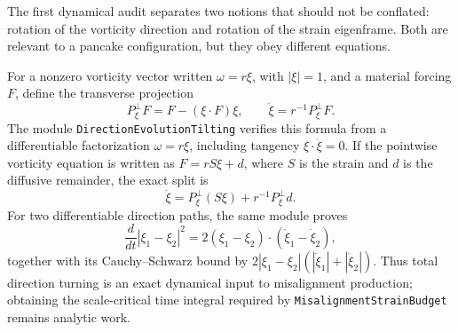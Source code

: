 \documentclass[11pt]{article}
\theoremstyle{definition}
\begin{document}
The first dynamical audit separates two notions that should not be
conflated: rotation of the vorticity direction and rotation of the strain
eigenframe.  Both are relevant to a pancake configuration, but they obey
different equations.

For a nonzero vorticity vector written $\omega=r\xi$, with $|\xi|=1$, and a
material forcing $F$, define the transverse projection
\[
  P_{\xi}^{\perp}F=F-(\xi\cdot F)\xi,
  \qquad \dot\xi=r^{-1}P_{\xi}^{\perp}F.
\]
The module \texttt{DirectionEvolutionTilting} verifies this formula from a
differentiable factorization $\omega=r\xi$, including tangency
$\xi\cdot\dot\xi=0$.  If the pointwise vorticity equation is written as
$F=rS\xi+d$, where $S$ is the strain and $d$ is the diffusive remainder,
the exact split is
\[
  \dot\xi=P_{\xi}^{\perp}(S\xi)
       +r^{-1}P_{\xi}^{\perp}d.
\]
For two differentiable direction paths, the same module proves
\[
  \frac{d}{dt}|\xi_1-\xi_2|^2
   =2(\xi_1-\xi_2)\cdot(\dot\xi_1-\dot\xi_2),
\]
together with its Cauchy--Schwarz bound by
$2|\xi_1-\xi_2|(|\dot\xi_1|+|\dot\xi_2|)$.  Thus total direction turning is
an exact dynamical input to misalignment production; obtaining the
scale-critical time integral required by \texttt{MisalignmentStrainBudget}
remains analytic work.
\end{document}
